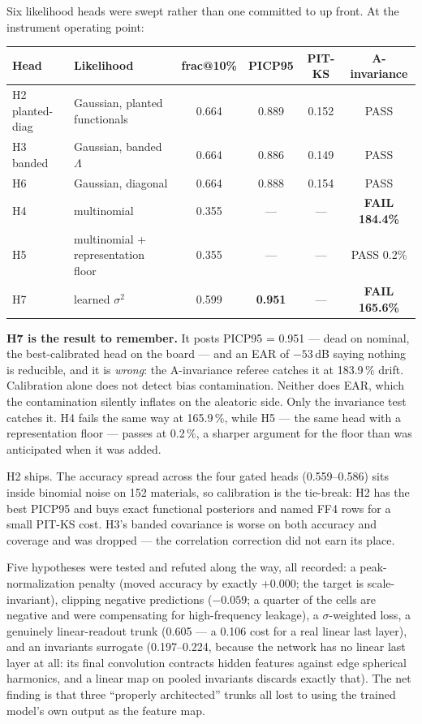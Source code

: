 \documentclass[11pt]{article}
\begin{document}

Six likelihood heads were swept rather than one committed to up front. At the
instrument operating point:

\begin{center}\boardfont
\begin{tabular}{|l|l|c|c|c|c|}
\hline
\textbf{Head} & \textbf{Likelihood} & \textbf{frac@10\%} & \textbf{PICP95} & \textbf{PIT-KS} & \textbf{A-invariance} \\ \hline
H2 planted-diag & Gaussian, planted functionals & 0.664 & 0.889 & 0.152 & PASS \\ \hline
H3 banded & Gaussian, banded $\Lambda$ & 0.664 & 0.886 & 0.149 & PASS \\ \hline
H6 & Gaussian, diagonal & 0.664 & 0.888 & 0.154 & PASS \\ \hline
H4 & multinomial & 0.355 & --- & --- & \textbf{FAIL 184.4\%} \\ \hline
H5 & multinomial + representation floor & 0.355 & --- & --- & PASS 0.2\% \\ \hline
H7 & learned $\sigma^2$ & 0.599 & \textbf{0.951} & --- & \textbf{FAIL 165.6\%} \\ \hline
\end{tabular}
\end{center}

\noindent \textbf{H7 is the result to remember.} It posts PICP95 = 0.951 ---
dead on nominal, the best-calibrated head on the board --- and an EAR of
$-53$\,dB saying nothing is reducible, and it is \emph{wrong}: the
A-invariance referee catches it at 183.9\,\% drift. Calibration alone does not
detect bias contamination. Neither does EAR, which the contamination silently
inflates on the aleatoric side. Only the invariance test catches it. H4 fails
the same way at 165.9\,\%, while H5 --- the same head with a representation
floor --- passes at 0.2\,\%, a sharper argument for the floor than was
anticipated when it was added.

H2 ships. The accuracy spread across the four gated heads (0.559--0.586) sits
inside binomial noise on 152 materials, so calibration is the tie-break: H2 has
the best PICP95 and buys exact functional posteriors and named FF4 rows for a
small PIT-KS cost. H3's banded covariance is worse on both
accuracy and coverage and was dropped --- the correlation correction did not
earn its place.

Five hypotheses were tested and refuted along the way, all recorded: a
peak-normalization penalty (moved accuracy by exactly $+0.000$; the target is
scale-invariant), clipping negative predictions ($-0.059$; a quarter of the
cells are negative and were compensating for high-frequency leakage), a
$\sigma$-weighted loss, a genuinely linear-readout trunk (0.605 --- a 0.106
cost for a real linear last layer), and an invariants surrogate (0.197--0.224,
because the network has no linear last layer at all: its final convolution
contracts hidden features against edge spherical harmonics, and a linear map
on pooled invariants discards exactly that). The net finding is that three
``properly architected'' trunks all lost to using the trained model's own
output as the feature map.
\end{document}
